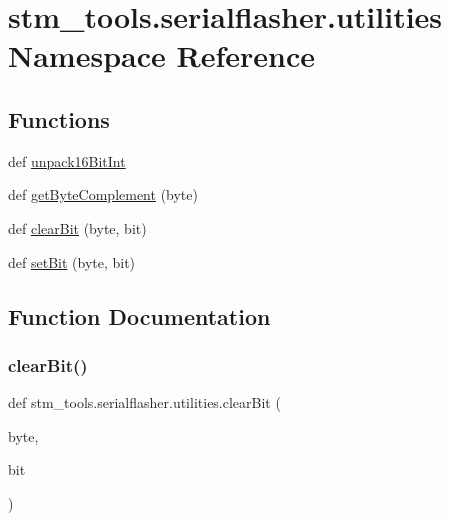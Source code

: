 \hypertarget{namespacestm__tools_1_1serialflasher_1_1utilities}{}\section{stm\+\_\+tools.\+serialflasher.\+utilities Namespace Reference}
\label{namespacestm__tools_1_1serialflasher_1_1utilities}
\subsection*{Functions}
\begin{DoxyCompactItemize}
\item 
def \hyperlink{namespacestm__tools_1_1serialflasher_1_1utilities_a6b7d44fd38da6115bfc6e3eb77e6a69c}{unpack16\+Bit\+Int}
\item 
def \hyperlink{namespacestm__tools_1_1serialflasher_1_1utilities_a23faa11a3dac6cfd91613830f4bd8916}{get\+Byte\+Complement} (byte)
\item 
def \hyperlink{namespacestm__tools_1_1serialflasher_1_1utilities_aab173d5ef25c8fa59fbff1618da732ab}{clear\+Bit} (byte, bit)
\item 
def \hyperlink{namespacestm__tools_1_1serialflasher_1_1utilities_a6372484104fa9ee813d5f48004e551a4}{set\+Bit} (byte, bit)
\end{DoxyCompactItemize}


\subsection{Function Documentation}
\mbox{\label{namespacestm__tools_1_1serialflasher_1_1utilities_aab173d5ef25c8fa59fbff1618da732ab}} 
\subsubsection{\texorpdfstring{clear\+Bit()}{clearBit()}}
{\footnotesize\ttfamily def stm\+\_\+tools.\+serialflasher.\+utilities.\+clear\+Bit (\begin{DoxyParamCaption}\item[{}]{byte,  }\item[{}]{bit }\end{DoxyParamCaption})}

